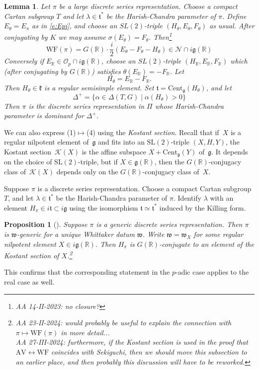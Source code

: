 \documentclass[10pt,leqno]{article}
\newtheorem{lemma}[equation]{Lemma}
\newtheorem{proposition}[equation]{Proposition}
\newcommand{\Cent}{\mathrm{Cent}}
\renewcommand{\O}{\mathcal O}
\newcommand{\R}{\mathbb R}
\newcommand{\N}{\mathcal N}
\renewcommand{\k}{\mathfrak k}
\renewcommand{\t}{\mathfrak t}
\newcommand{\g}{\mathfrak g}
\newcommand{\SL}{\text{SL}}
\newcommand{\w}{\mathfrak w}
\newcommand{\AV}{\mathrm{AV}}
\newcommand{\WF}{\mathrm{WF}}
\newcommand{\Op}{\O_p}
\newcommand{\Kostant}[1]{\mathcal{K}(#1)}
\begin{document}
\begin{lemma}
  Let $\pi$ be a large discrete series representation.
Choose a compact Cartan subgroup $T$ and let $\lambda\in \t^*$ be the Harish-Chandra parameter of $\pi$.
Define $E_\theta=E_\pi$ as in \eqref{e:Epi}, and choose an $SL(2)$-triple $(H_\theta,E_\theta,F_\theta)$ as usual.
After conjugating by $K$ we may assume $\sigma(E_\theta)=F_\theta$.  Then\footnote{AA 14-II-2023: no closure?}
$$
\WF(\pi)=G(\R)\cdot\frac i2(E_\theta-F_\theta-H_\theta)\in\N\cap i\g(\R)
$$
Conversely if $E_\R\in \Op\cap i\g(\R)$, choose an $SL(2)$-triple $(H_\R,E_\R,F_\R)$ which (after conjugating by $G(\R)$) satisfies $\theta(E_\R)=-F_\R$.
Let
$$
H_\theta=E_\R-F_\R.
$$
Then $H_\theta\in\k$ is a regular semisimple element.
Set $\t=\Cent_{\g}(H_\theta)$, and let
$$
\Delta^+=\{\alpha\in\Delta(T,G)\mid  \alpha(H_\theta)>0\}
$$
Then $\pi$ is the discrete series representation in $\Pi$ whose Harish-Chandra parameter is dominant for $\Delta^+$. 
\end{lemma}

We can also express (1)$\mapsto$(4) using the {\it Kostant section}. Recall that if~$X$ is a regular nilpotent element of~$\g$ and fits into an $\SL(2)$-triple $(X, H, Y)$, the Kostant section~$\Kostant{X}$ is the affine subspace $X + \mathrm{Cent}_{\g}(Y)$ of~$\g$. It depends on the choice of $\SL(2)$-triple, but if $X \in \g(\R)$, then the $G(\R)$-conjugacy class of~$\Kostant{X}$ depends only on the $G(\R)$-conjugacy class of~$X$. 

Suppose $\pi$ is a discrete series representation.
Choose a compact Cartan subgroup $T$, and let $\lambda\in\t^*$ be the Harish-Chandra parameter of $\pi$.
Identify $\lambda$ with an element $H_\pi\in i\t\subset i\g$ using the isomorphism $\t\simeq \t^*$ induced by the Killing form. 

\begin{proposition}[\cite{adams_kaletha}]
Suppose $\pi$ is a generic discrete series representation. Then $\pi$ is $\w$-generic
for a unique Whittaker datum $\w$.
Write $\w=\w_X$ for some regular nilpotent element $X\in i\g(\R)$.
Then $H_\pi$ is $G(\R)$-conjugate to an element of the Kostant section of $X$.\footnote{AA 23-II-2024: would probably be useful to explain the connection with $\pi \mapsto \WF(\pi)$ in more detail...\\ AA 27-III-2024: furthermore, if the Kostant section is used in the proof that $\AV \leftrightarrow \WF$ coincides with Sekiguchi, then we should move this subsection to an earlier place, and then probably this discussion will have to be reworked.  }
\end{proposition}


This confirms that  the corresponding statement  in the $p$-adic case \cite{debacker_reeder_generic, kaletha_epipelagic}
applies to the real case as well.



\end{document}
